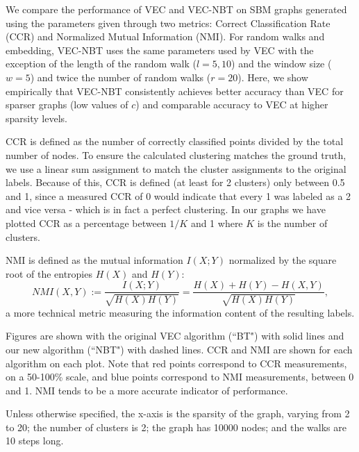 \documentclass{article} %
\begin{document}
We compare the performance of VEC and VEC-NBT on SBM graphs generated using the parameters given through two metrics: Correct Classification Rate (CCR) and Normalized Mutual Information (NMI). For random walks and embedding, VEC-NBT uses the same parameters used by VEC with the exception of the length of the random walk ($l=5, 10$) and the window size ($w=5$) and twice the number of random walks ($r=20$). Here, we show empirically that VEC-NBT consistently achieves better accuracy than VEC for sparser graphs (low values of $c$) and comparable accuracy to VEC at higher sparsity levels.

CCR is defined as the number of correctly classified points divided by the total number of nodes. To ensure the calculated clustering matches the ground truth, we use a linear sum assignment to match the cluster assignments to the original labels. Because of this, CCR is defined (at least for 2 clusters) only between 0.5 and 1, since a measured CCR of 0 would indicate that every 1 was labeled as a 2 and vice versa - which is in fact a perfect clustering. In our graphs we have plotted CCR as a percentage between $1/K$ and 1 where $K$ is the number of clusters.

NMI is defined as the mutual information $I(X;Y)$ normalized by the square root of the entropies $H(X)$ and $H(Y)$:
$$NMI(X,Y) := \frac{I(X;Y)}{\sqrt{H(X)H(Y)}} = \frac{H(X)+H(Y)-H(X,Y)}{\sqrt{H(X)H(Y)}},$$
a more technical metric measuring the information content of the resulting labels.

Figures are shown with the original VEC algorithm (``BT") with solid lines and our new algorithm (``NBT") with dashed lines. CCR and NMI are shown for each algorithm on each plot. Note that red points correspond to CCR measurements, on a 50-100\% scale, and blue points correspond to NMI measurements, between 0 and 1. NMI tends to be a more accurate indicator of performance.

Unless otherwise specified, the x-axis is the sparsity of the graph, varying from 2 to 20; the number of clusters is 2; the graph has 10000 nodes; and the walks are 10 steps long.
\end{document}
